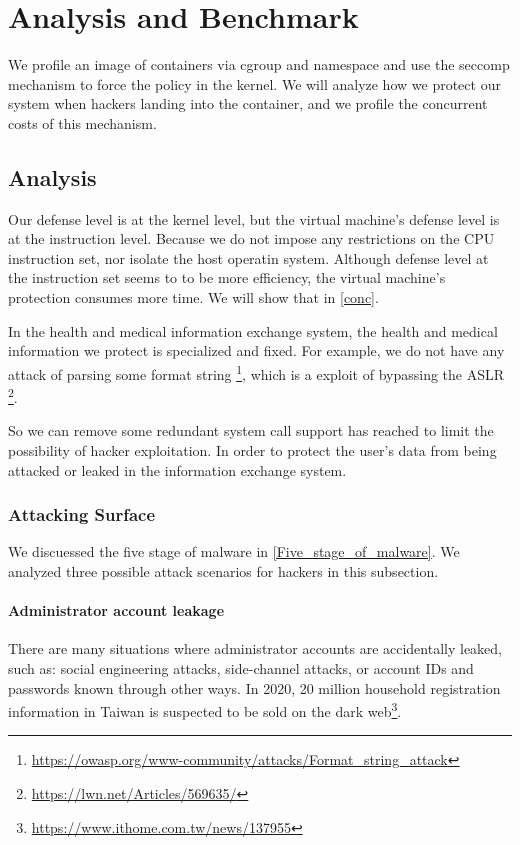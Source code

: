 \chapter{Analysis and Benchmark}

We profile an image of containers via cgroup and namespace
and use the seccomp mechanism to force the policy in the kernel.
We will analyze how we protect our system when hackers landing
into the container, and we profile the concurrent costs of this
mechanism.

\section{Analysis}
Our defense level is at the kernel level, but the virtual machine's
defense level is at the instruction level. Because we do not impose any
restrictions on the CPU instruction set, nor isolate the host operatin system.
Although defense level at the instruction set seems to to be more efficiency,
the virtual machine's protection consumes more time. We will show that in \ref{conc}.

In the health and medical information exchange system, the health and
medical information we protect is specialized and fixed. For example,
we do not have any attack of parsing some format string
\footnote{\url{https://owasp.org/www-community/attacks/Format_string_attack}},
which is a exploit of bypassing the ASLR \footnote{\url{https://lwn.net/Articles/569635/}}.

So we can remove some redundant system call support has reached to
limit the possibility of hacker exploitation. In order to protect
the user's data from being attacked or leaked in the information exchange system.

\subsection{Attacking Surface}
We discuessed the five stage of malware in \ref{Five_stage_of_malware}. We analyzed
three possible attack scenarios for hackers in this subsection.

\subsubsection{Administrator account leakage}
There are many situations where administrator accounts are accidentally
leaked, such as: social engineering attacks, side-channel attacks,
or account IDs and passwords known through other ways.
In 2020, 20 million household registration information in Taiwan is
suspected to be sold on the dark web\footnote{\url{https://www.ithome.com.tw/news/137955}}.

